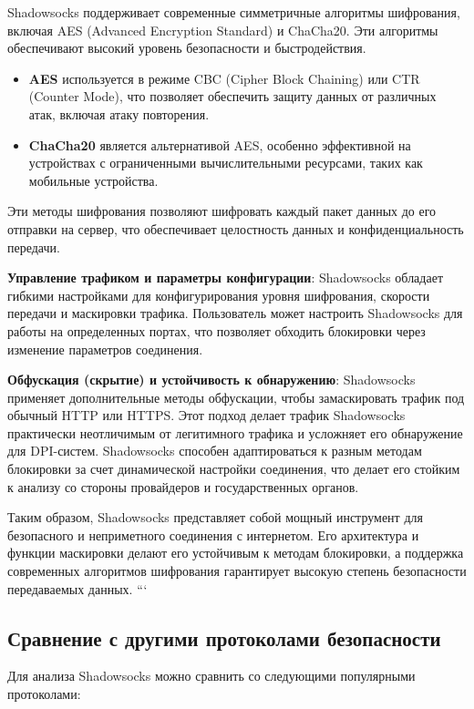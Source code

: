 \documentclass{SCWorks}
\begin{document}
\textbf{}Shadowsocks поддерживает современные симметричные алгоритмы шифрования, включая AES (Advanced Encryption Standard) и ChaCha20. Эти алгоритмы обеспечивают высокий уровень безопасности и быстродействия. 
\begin{itemize}
    \item \textbf{AES} используется в режиме CBC (Cipher Block Chaining) или CTR (Counter Mode), что позволяет обеспечить защиту данных от различных атак, включая атаку повторения.
    \item \textbf{ChaCha20} является альтернативой AES, особенно эффективной на устройствах с ограниченными вычислительными ресурсами, таких как мобильные устройства.
\end{itemize}
Эти методы шифрования позволяют шифровать каждый пакет данных до его отправки на сервер, что обеспечивает целостность данных и конфиденциальность передачи.

\textbf{Управление трафиком и параметры конфигурации}: Shadowsocks обладает гибкими настройками для конфигурирования уровня шифрования, скорости передачи и маскировки трафика. Пользователь может настроить Shadowsocks для работы на определенных портах, что позволяет обходить блокировки через изменение параметров соединения.

\textbf{Обфускация (скрытие) и устойчивость к обнаружению}: Shadowsocks применяет дополнительные методы обфускации, чтобы замаскировать трафик под обычный HTTP или HTTPS. Этот подход делает трафик Shadowsocks практически неотличимым от легитимного трафика и усложняет его обнаружение для DPI-систем. Shadowsocks способен адаптироваться к разным методам блокировки за счет динамической настройки соединения, что делает его стойким к анализу со стороны провайдеров и государственных органов.

Таким образом, Shadowsocks представляет собой мощный инструмент для безопасного и неприметного соединения с интернетом. Его архитектура и функции маскировки делают его устойчивым к методам блокировки, а поддержка современных алгоритмов шифрования гарантирует высокую степень безопасности передаваемых данных.
```
\subsection{Сравнение с другими протоколами безопасности}

Для анализа Shadowsocks можно сравнить со следующими популярными протоколами:
\end{document}

